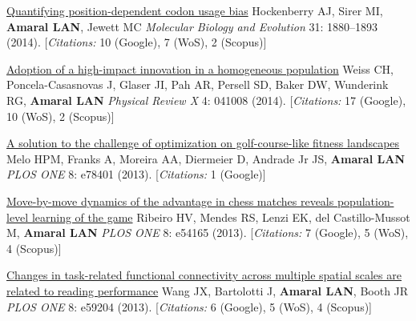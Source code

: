 \NumberedItem{\makebox[0.8cm][r]{[105]}}
\href{/people/amaral/quantifying-position-dependent-codon-usage-bias}
{Quantifying position-dependent codon usage bias}
\newline
Hockenberry AJ, Sirer MI, {\textbf{Amaral LAN}}, Jewett MC
\newline
\textit{Molecular Biology and Evolution}
    31:
1880--1893 (2014).
    [{\em{Citations:}} 10 (Google), 7 (WoS), 2 (Scopus)]
\newline
\Gap
~
\Gap

\NumberedItem{\makebox[0.8cm][r]{[104]}}
\href{/people/amaral/adoption-high-impact-innovation-homogeneous-population}
{Adoption of a high-impact innovation in a homogeneous population}
\newline
Weiss CH, Poncela-Casasnovas J, Glaser JI, Pah AR, Persell SD, Baker DW, Wunderink RG, {\textbf{Amaral LAN}}
\newline
\textit{Physical Review X}
    4:
041008 (2014).
    [{\em{Citations:}} 17 (Google), 10 (WoS), 2 (Scopus)]
\newline
\Gap
~
\Gap

\NumberedItem{\makebox[0.8cm][r]{[103]}}
\href{/people/amaral/solution_to_challenge}
{A solution to the challenge of optimization on golf-course-like fitness landscapes}
\newline
Melo HPM, Franks A, Moreira AA, Diermeier D, Andrade Jr JS, {\textbf{Amaral LAN}}
\newline
\textit{PLOS ONE}
    8:
e78401 (2013).
    [{\em{Citations:}} 1 (Google)]
\newline
\Gap
~
\Gap

\NumberedItem{\makebox[0.8cm][r]{[102]}}
\href{/people/amaral/move-move-dynamics-advantage-chess-matches-reveals-population-level-learning-game}
{Move-by-move dynamics of the advantage in chess matches reveals population-level learning of the game}
\newline
Ribeiro HV, Mendes RS, Lenzi EK, del Castillo-Mussot M, {\textbf{Amaral LAN}}
\newline
\textit{PLOS ONE}
    8:
e54165 (2013).
    [{\em{Citations:}} 7 (Google), 5 (WoS), 4 (Scopus)]
\newline
\Gap
~
\Gap

\NumberedItem{\makebox[0.8cm][r]{[101]}}
\href{/people/amaral/changes-task-related-functional-connectivity-across-multiple-spatial-scales-are-related-reading-performance}
{Changes in task-related functional connectivity across multiple spatial scales are related to reading performance}
\newline
Wang JX, Bartolotti J, {\textbf{Amaral LAN}}, Booth JR
\newline
\textit{PLOS ONE}
    8:
e59204 (2013).
    [{\em{Citations:}} 6 (Google), 5 (WoS), 4 (Scopus)]
\newline
\Gap
~
\Gap

